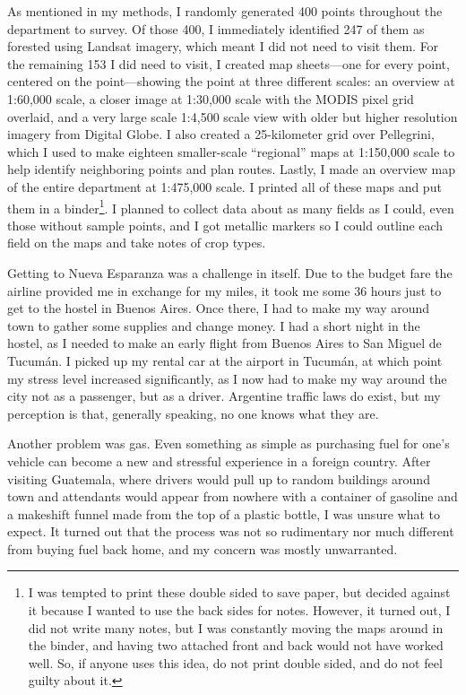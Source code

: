 As mentioned in my methods, I randomly generated 400 points throughout the department to survey. Of those 400, I immediately identified 247 of them as forested using Landsat imagery, which meant I did not need to visit them. For the remaining 153 I did need to visit, I created map sheets—one for every point, centered on the point—showing the point at three different scales: an overview at 1:60,000 scale, a closer image at 1:30,000 scale with the MODIS pixel grid overlaid, and a very large scale 1:4,500 scale view with older but higher resolution imagery from Digital Globe. I also created a 25-kilometer grid over Pellegrini, which I used to make eighteen smaller-scale ``regional'' maps at 1:150,000 scale to help identify neighboring points and plan routes. Lastly, I made an overview map of the entire department at 1:475,000 scale. I printed all of these maps and put them in a binder\footnote{I was tempted to print these double sided to save paper, but decided against it because I wanted to use the back sides for notes. However, it turned out, I did not write many notes, but I was constantly moving the maps around in the binder, and having two attached front and back would not have worked well. So, if anyone uses this idea, do not print double sided, and do not feel guilty about it.}. I planned to collect data about as many fields as I could, even those without sample points, and I got metallic markers so I could outline each field on the maps and take notes of crop types.

Getting to Nueva Esparanza was a challenge in itself. Due to the budget fare the airline provided me in exchange for my miles, it took me some 36 hours just to get to the hostel in Buenos Aires. Once there, I had to make my way around town to gather some supplies and change money. I had a short night in the hostel, as I needed to make an early flight from Buenos Aires to San Miguel de Tucumán. I picked up my rental car at the airport in Tucumán, at which point my stress level increased significantly, as I now had to make my way around the city not as a passenger, but as a driver. Argentine traffic laws do exist, but my perception is that, generally speaking, no one knows what they are.

Another problem was gas. Even something as simple as purchasing fuel for one’s vehicle can become a new and stressful experience in a foreign country. After visiting Guatemala, where drivers would pull up to random buildings around town and attendants would appear from nowhere with a container of gasoline and a makeshift funnel made from the top of a plastic bottle, I was unsure what to expect. It turned out that the process was not so rudimentary nor much different from buying fuel back home, and my concern was mostly unwarranted.

